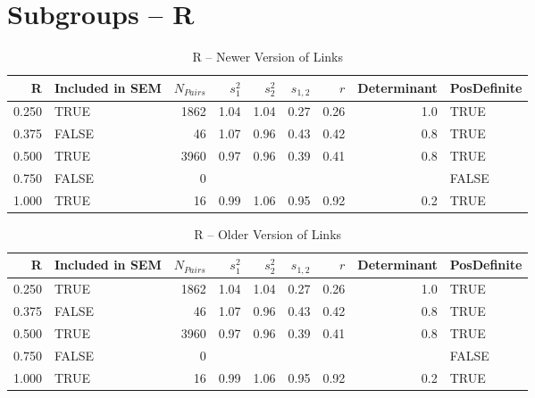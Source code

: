 \documentclass{article}\usepackage{graphicx, color}
\begin{document}
\section{Subgroups --  R }%
\begin{table}[ht]
\begin{center}
\begin{tabular}{rlrrrrrrl}
  \hline
R & Included in SEM & $N_{Pairs}$ & $s_1^2$ & $s_2^2$ & $s_{1,2}$ & $r$ & Determinant & PosDefinite \\ 
  \hline
0.250 & TRUE & 1862 & 1.04 & 1.04 & 0.27 & 0.26 & 1.0 & TRUE \\ 
  0.375 & FALSE & 46 & 1.07 & 0.96 & 0.43 & 0.42 & 0.8 & TRUE \\ 
  0.500 & TRUE & 3960 & 0.97 & 0.96 & 0.39 & 0.41 & 0.8 & TRUE \\ 
  0.750 & FALSE & 0 &  &  &  &  &  & FALSE \\ 
  1.000 & TRUE & 16 & 0.99 & 1.06 & 0.95 & 0.92 & 0.2 & TRUE \\ 
   \hline
\end{tabular}
\caption{R -- Newer Version of Links}
\end{center}
\end{table}
\begin{table}[ht]
\begin{center}
\begin{tabular}{rlrrrrrrl}
  \hline
R & Included in SEM & $N_{Pairs}$ & $s_1^2$ & $s_2^2$ & $s_{1,2}$ & $r$ & Determinant & PosDefinite \\ 
  \hline
0.250 & TRUE & 1862 & 1.04 & 1.04 & 0.27 & 0.26 & 1.0 & TRUE \\ 
  0.375 & FALSE & 46 & 1.07 & 0.96 & 0.43 & 0.42 & 0.8 & TRUE \\ 
  0.500 & TRUE & 3960 & 0.97 & 0.96 & 0.39 & 0.41 & 0.8 & TRUE \\ 
  0.750 & FALSE & 0 &  &  &  &  &  & FALSE \\ 
  1.000 & TRUE & 16 & 0.99 & 1.06 & 0.95 & 0.92 & 0.2 & TRUE \\ 
   \hline
\end{tabular}
\caption{R -- Older Version of Links}
\end{center}
\end{table}
\newpage 
\end{document}
